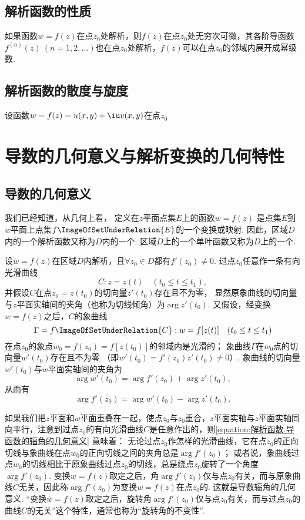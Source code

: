 \subsection{解析函数的性质}
如果函数\(w=f(z)\)在点\(z_0\)处解析，则\(f(z)\)在点\(z_0\)处无穷次可微，其各阶导函数\(f^{(n)}(z)\ (n=1,2,\dotsc)\)也在点\(z_0\)处解析，\(f(z)\)可以在点\(z_0\)的邻域内展开成幂级数.

\subsection{解析函数的散度与旋度}
设函数\(w=f(z)=u(x,y)+\iu v(x,y)\)在点\(z_0\)

\section{导数的几何意义与解析变换的几何特性}
\subsection{导数的几何意义}
我们已经知道，从几何上看，
定义在\(z\)平面点集\(E\)上的函数\(w = f(z)\)
是点集\(E\)到\(w\)平面上点集\(f\ImageOfSetUnderRelation{E}\)的一个变换或映射.
因此，区域\(D\)内的一个解析函数又称为\(D\)内的一个.
区域\(D\)上的一个单叶函数又称为\(D\)上的一个.

设\(w = f(z)\)在区域\(D\)内解析，且\(\forall z_0 \in D\)都有\(f'(z_0) \neq 0\).
过点\(z_0\)任意作一条有向光滑曲线\[
	C: z = z(t)
	\quad(t_0 \leq t \leq t_1),
\]
并假设\(C\)在点\(z_0 = z(t_0)\)的切向量\(z'(t_0)\)存在且不为零，
显然原象曲线的切向量与\(z\)平面实轴间的夹角（也称为切线倾角）为\(\arg z'(t_0)\).
又假设，经变换\(w = f(z)\)之后，\(C\)的象曲线\[
	\Gamma = f\ImageOfSetUnderRelation{C}: w = f[z(t)]
	\quad(t_0 \leq t \leq t_1)
\]在点\(z_0\)的象点\(w_0 = f(z_0) = f[z(t_0)]\)的邻域内是光滑的；
象曲线\(\Gamma\)在\(w_0\)点的切向量\(w'(t_0)\)存在且不为零
（即\(w'(t_0) = f'(z_0) z'(t_0) \neq 0\)）.
象曲线的切向量\(w'(t_0)\)与\(w\)平面实轴间的夹角为\[
	\arg w'(t_0) = \arg f'(z_0) + \arg z'(t_0),
\]
从而有\begin{equation}\label{equation:解析函数.导函数的辐角的几何意义}
	\arg f'(z_0) = \arg w'(t_0) - \arg z'(t_0).
\end{equation}

如果我们把\(z\)平面和\(w\)平面重叠在一起，使点\(z_0\)与\(z_0\)重合，\(z\)平面实轴与\(z\)平面实轴同向平行，注意到过点\(z_0\)的有向光滑曲线\(C\)是任意作出的，则\cref{equation:解析函数.导函数的辐角的几何意义} 意味着：
无论过点\(z_0\)作怎样的光滑曲线，它在点\(z_0\)的正向切线与象曲线在点\(w_0\)的正向切线之间的夹角总是\(\arg f'(z_0)\)；
或者说，象曲线过点\(w_0\)的切线相比于原象曲线过点\(z_0\)的切线，总是绕点\(z_0\)旋转了一个角度\(\arg f'(z_0)\).
变换\(w = f(z)\)取定之后，角\(\arg f'(z_0)\)仅与点\(z_0\)有关，而与原象曲线\(C\)无关，因此称\(\arg f'(z_0)\)为变换\(w = f(z)\)在点\(z_0\)的.
这就是导数辐角的几何意义.
“变换\(w = f(z)\)取定之后，旋转角\(\arg f'(z_0)\)仅与点\(z_0\)有关，而与过点\(z_0\)的曲线\(C\)的无关”这个特性，通常也称为“旋转角的不变性”.

